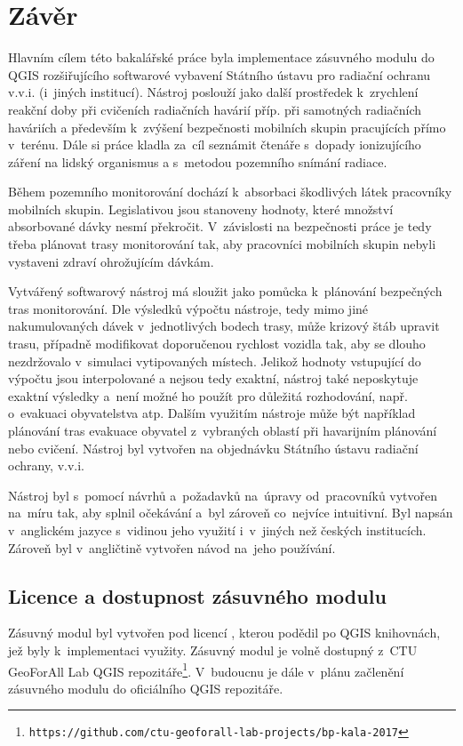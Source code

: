 \chapter{Závěr}
\label{5-zaver}

Hlavním cílem této bakalářské práce byla implementace zásuvného modulu
do QGIS rozšiřujícího softwarové vybavení Státního ústavu pro radiační
ochranu v.v.i. (i~jiných institucí). Nástroj poslouží jako další
prostředek k~zrychlení reakční doby při cvičeních radiačních havárií
příp. při samotných radiačních haváriích a především k~zvýšení
bezpečnosti mobilních skupin pracujících přímo v~terénu. Dále si práce
kladla za~cíl seznámit čtenáře s~dopady ionizujícího záření na lidský
organismus a s~metodou pozemního snímání radiace.

Během pozemního monitorování dochází
k~absorbaci škodlivých látek pracovníky mobilních skupin. Legislativou jsou
stanoveny hodnoty, které množství absorbované dávky nesmí
překročit. V~závislosti na bezpečnosti práce je tedy třeba plánovat
trasy monitorování tak, aby pracovníci mobilních skupin nebyli vystaveni zdraví
ohrožujícím dávkám.

Vytvářený softwarový nástroj má sloužit jako pomůcka k~plánování bezpečných tras
monitorování. Dle výsledků výpočtu nástroje, tedy mimo jiné
nakumulovaných dávek v~jednotlivých bodech trasy, může krizový štáb
upravit trasu, případně mo\-difikovat doporučenou rychlost vozidla tak,
aby se dlouho nezdržovalo v~simulaci vytipovaných 
místech. Jelikož hodnoty vstupující do výpočtu jsou interpolované a
nejsou tedy exaktní, nástroj také neposkytuje exaktní výsledky a~není
možné ho použít pro důležitá rozhodování, např. o~evakuaci
obyvatelstva atp. Dalším využitím nástroje může být například
plánování tras evakuace obyvatel z~vybraných oblastí při havarijním
plánování nebo cvičení. Nástroj byl vytvořen na objednávku Státního
ústavu radiační ochrany, v.v.i.

Nástroj byl s~pomocí návrhů a~požadavků na~úpravy od~pracovníků
 vytvořen na~míru tak, aby splnil očekávání a~byl zároveň 
co~nejvíce intuitivní. Byl napsán v~anglickém jazyce s~vidinou
jeho využití i~v~jiných než českých institucích. Zároveň byl
v~angličtině vytvořen návod na~jeho používání.

\section{Licence a dostupnost zásuvného modulu} Zásuvný modul byl
vytvořen pod licencí , kterou podědil po QGIS knihovnách,
jež byly k~implementaci využity. Zásuvný modul je volně dostupný z~CTU
GeoForAll Lab QGIS
repozitáře\footnote{\texttt{https://github.com/ctu-geoforall-lab-projects/bp-kala-2017}}. V~budoucnu
je dále v~plánu začlenění zásuvného modulu do oficiálního QGIS
repozitáře.

 




